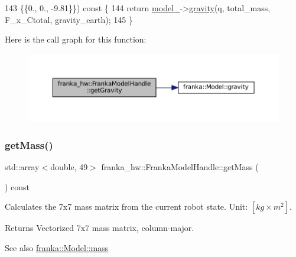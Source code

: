 \begin{DoxyCode}
143                                                  \{\{0., 0., -9.81\}\}) \textcolor{keyword}{const} \{
144     \textcolor{keywordflow}{return} \hyperlink{classfranka__hw_1_1FrankaModelHandle_a0c47e6c735f1bd809581b0498d53349b}{model\_}->\hyperlink{classfranka_1_1Model_a9ebf2dbe37a78071fd74d2e552125cb4}{gravity}(q, total\_mass, F\_x\_Ctotal, gravity\_earth);
145   \}
\end{DoxyCode}
Here is the call graph for this function\+:
\nopagebreak
\begin{figure}[H]
\begin{center}
\leavevmode
\includegraphics[width=350pt]{classfranka__hw_1_1FrankaModelHandle_a832505472a8e7bc9e12f26a57eb659f8_cgraph}
\end{center}
\end{figure}
\mbox{\label{classfranka__hw_1_1FrankaModelHandle_a252d6872afa722e55d2a9cba4ac42088}} 
\subsubsection{\texorpdfstring{get\+Mass()}{getMass()}\hspace{0.1cm}{\footnotesize\ttfamily [1/2]}}
{\footnotesize\ttfamily std\+::array$<$double, 49$>$ franka\+\_\+hw\+::\+Franka\+Model\+Handle\+::get\+Mass (\begin{DoxyParamCaption}{ }\end{DoxyParamCaption}) const\hspace{0.3cm}{\ttfamily [inline]}}

Calculates the 7x7 mass matrix from the current robot state. Unit\+: $[kg \times m^2]$.

\begin{DoxyReturn}{Returns}
Vectorized 7x7 mass matrix, column-\/major.
\end{DoxyReturn}
\begin{DoxySeeAlso}{See also}
\hyperlink{classfranka_1_1Model_a39eefe959a2a9155b4782b98ad766530}{franka\+::\+Model\+::mass} 
\end{DoxySeeAlso}


